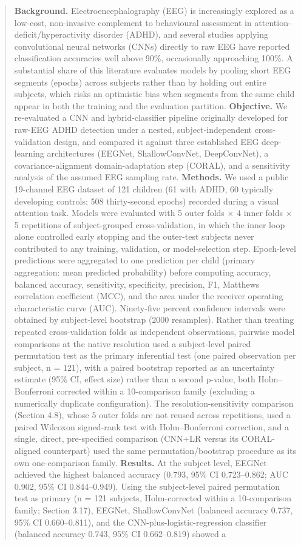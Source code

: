 \documentclass[a4paper,fleqn]{cas-sc}
\begin{document}
\begin{abstract}
\textbf{Background.} Electroencephalography (EEG) is increasingly explored as a low-cost, non-invasive complement to behavioural assessment in attention-deficit/hyperactivity disorder (ADHD), and several studies applying convolutional neural networks (CNNs) directly to raw EEG have reported classification accuracies well above 90\%, occasionally approaching 100\%. A substantial share of this literature evaluates models by pooling short EEG segments (epochs) across subjects rather than by holding out entire subjects, which risks an optimistic bias when segments from the same child appear in both the training and the evaluation partition. \textbf{Objective.} We re-evaluated a CNN and hybrid-classifier pipeline originally developed for raw-EEG ADHD detection under a nested, subject-independent cross-validation design, and compared it against three established EEG deep-learning architectures (EEGNet, ShallowConvNet, DeepConvNet), a covariance-alignment domain-adaptation step (CORAL), and a sensitivity analysis of the assumed EEG sampling rate. \textbf{Methods.} We used a public 19-channel EEG dataset of 121 children (61 with ADHD, 60 typically developing controls; 508 thirty-second epochs) recorded during a visual attention task. Models were evaluated with 5 outer folds $\times$ 4 inner folds $\times$ 5 repetitions of subject-grouped cross-validation, in which the inner loop alone controlled early stopping and the outer-test subjects never contributed to any training, validation, or model-selection step. Epoch-level predictions were aggregated to one prediction per child (primary aggregation: mean predicted probability) before computing accuracy, balanced accuracy, sensitivity, specificity, precision, F1, Matthews correlation coefficient (MCC), and the area under the receiver operating characteristic curve (AUC). Ninety-five percent confidence intervals were obtained by subject-level bootstrap (2000 resamples). Rather than treating repeated cross-validation folds as independent observations, pairwise model comparisons at the native resolution used a subject-level paired permutation test as the primary inferential test (one paired observation per subject, n = 121), with a paired bootstrap reported as an uncertainty estimate (95\% CI, effect size) rather than a second p-value, both Holm--Bonferroni corrected within a 10-comparison family (excluding a numerically duplicate configuration). The resolution-sensitivity comparison (Section 4.8), whose 5 outer folds are not reused across repetitions, used a paired Wilcoxon signed-rank test with Holm--Bonferroni correction, and a single, direct, pre-specified comparison (CNN+LR versus its CORAL-aligned counterpart) used the same permutation/bootstrap procedure as its own one-comparison family. \textbf{Results.} At the subject level, EEGNet achieved the highest balanced accuracy (0.793, 95\% CI 0.723--0.862; AUC 0.902, 95\% CI 0.844--0.949). Using the subject-level paired permutation test as primary (n = 121 subjects, Holm-corrected within a 10-comparison family; Section 3.17), EEGNet, ShallowConvNet (balanced accuracy 0.737, 95\% CI 0.660--0.811), and the CNN-plus-logistic-regression classifier (balanced accuracy 0.743, 95\% CI 0.662--0.819) showed a 
\end{abstract}
\end{document}
